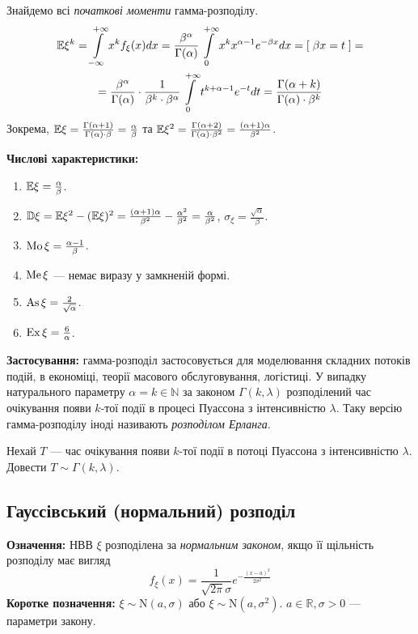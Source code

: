 Знайдемо всі \emph{початкові моменти} гамма-розподілу.
\begin{gather*}
    \mathbb{E}\xi^k = \int\limits_{-\infty}^{+\infty} x^k f_\xi(x)dx =
    \frac{\beta^\alpha}{\Gamma(\alpha)} \int\limits_0^{+\infty} x^k x^{\alpha-1} e^{-\beta x} dx =
    \left[\; \beta x = t \;\right] = \\
    = \frac{\beta^\alpha}{\Gamma(\alpha)} \cdot \frac{1}{\beta^k\cdot \beta^{\alpha}} \int\limits_0^{+\infty} t^{k+\alpha-1} e^{-t} dt =
    \frac{\Gamma(\alpha+k)}{\Gamma(\alpha) \cdot \beta^k}
\end{gather*}
Зокрема, $\mathbb{E}\xi = \frac{\Gamma(\alpha+1)}{\Gamma(\alpha) \cdot \beta} = \frac{\alpha}{\beta}$ та 
$\mathbb{E}\xi^2 = \frac{\Gamma(\alpha+2)}{\Gamma(\alpha) \cdot \beta^2}  = \frac{(\alpha+1)\alpha}{\beta^2}$.

\noindent\textbf{Числові характеристики:}
\begin{enumerate}
    \item $\mathbb{E}\xi = \frac{\alpha}{\beta}$.
    \item $\mathbb{D}\xi = \mathbb{E}\xi^2 - (\mathbb{E}\xi)^2 = \frac{(\alpha+1)\alpha}{\beta^2} - \frac{\alpha^2}{\beta^2} = \frac{\alpha}{\beta^2}$, $\sigma_\xi = \frac{\sqrt{\alpha}}{\beta}$.
    \item $\operatorname{Mo}\xi = \frac{\alpha-1}{\beta}$.
    \item $\operatorname{Me}\xi$ --- немає виразу у замкненій формі.
    \item $\operatorname{As}\xi = \frac{2}{\sqrt{\alpha}}$.
    \item $\operatorname{Ex}\xi = \frac{6}{\alpha}$.
\end{enumerate}

\noindent\textbf{Застосування:} гамма-розподіл застосовується для моделювання
складних потоків подій, в економіці, теорії масового обслуговування, логістиці.
У випадку натурального параметру $\alpha = k \in \mathbb{N}$ за законом
$\Gamma(k, \lambda)$ розподілений час очікування появи $k$-тої події
в процесі Пуассона з інтенсивністю $\lambda$. Таку версію гамма-розподілу іноді називають \emph{розподілом Ерланга}.
\begin{exercise}
    Нехай $T$ --- час очікування появи $k$-тої події
    в потоці Пуассона з інтенсивністю $\lambda$. Довести $T \sim \Gamma(k, \lambda)$.
\end{exercise} %

\subsection{Гауссівський (нормальний) розподіл}
\noindent\textbf{Означення:}
    НВВ $\xi$ розподілена за \emph{нормальним законом}, 
    якщо її щільність розподілу має вигляд 
    \begin{equation}
        f_\xi(x) = \frac{1}{\sqrt{2\pi}\sigma} e^{-\frac{(x-a)^2}{2\sigma^2}}
    \end{equation}
\textbf{Коротке позначення:} $\xi \sim \mathrm{N}(a, \sigma)$ або 
    $\xi \sim \mathrm{N}(a, \sigma^2)$.
    $a \in \mathbb{R}, \sigma > 0$ --- параметри закону.

